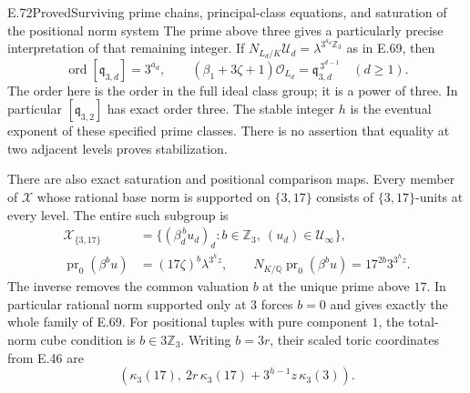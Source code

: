 \begin{statement}{E.72}{Proved}{Surviving prime chains, principal-class equations, and saturation of the positional norm system}
The prime above three gives a particularly precise interpretation
of that remaining integer. If
$N_{L_d/K}\mathcal U_d=\lambda^{3^{a_d}\mathbb Z_3}$
as in E.69, then
\[
 \operatorname{ord}[\mathfrak q_{3,d}]=3^{a_d},\qquad
 (\beta_1+3\zeta+1)\mathcal O_{L_d}
                =\mathfrak q_{3,d}^{\,3^{d-1}}
                    \quad(d\ge1).
 \tag{E72.9}
\]
The order here is the order in the full ideal class group;
it is a power of three. In particular
$[\mathfrak q_{3,2}]$ has exact order three. The stable integer
$h$ is the eventual exponent of these specified prime classes.
There is no assertion that equality at two adjacent levels
proves stabilization.

There are also exact saturation and positional comparison maps.
Every member of $\mathcal X$ whose rational base norm is supported
on $\{3,17\}$ consists of $\{3,17\}$-units at every level.
The entire such subgroup is
\[
 \begin{split}
 \mathcal X_{\{3,17\}}
   &=\{(\beta_d^{\,b}u_d)_d:
               b\in\mathbb Z_3,\ (u_d)\in\mathcal U_\infty\},\\
 \operatorname{pr}_0(\beta^b u)
   &=(17\zeta)^b\lambda^{3^h z},\qquad
 N_{K/\mathbb Q}\operatorname{pr}_0(\beta^b u)
                  =17^{2b}3^{3^h z}.
 \end{split}
 \tag{E72.10}
\]
The inverse removes the common valuation $b$ at the unique prime
above $17$. In particular rational norm supported only at $3$
forces $b=0$ and gives exactly the whole family of E.69.
For positional tuples with pure component $1$, the total-norm
cube condition is $b\in3\mathbb Z_3$. Writing $b=3r$, their
scaled toric coordinates from E.46 are
\[
       \left(\kappa_3(17),\
             2r\,\kappa_3(17)+3^{h-1}z\,\kappa_3(3)\right).
 \tag{E72.11}
\]


\end{statement}
